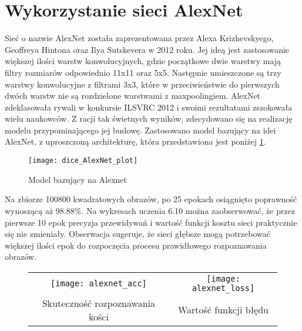 \section{Wykorzystanie sieci AlexNet}
Sieć o nazwie AlexNet \cite{AlexNetNVIDIA, AlexNetdesc, AlexNetpresentation} została
zaprezentowana przez Alexa Krizhevskyego, Geoffreya Hintona oraz Ilya Sutskevera w 2012 roku.
Jej ideą jest zastosowanie większej ilości warstw konwolucyjnych, gdzie początkowe dwie warstwy
mają filtry rozmiarów odpowiednio 11x11 oraz 5x5. Następnie umieszczone są trzy warstwy
konwolucyjne z filtrami 3x3, które w przeciwieństwie do pierwszych
dwóch warstw nie są rozdzielone warstwami z maxpoolingiem. AlexNet zdeklasowała rywali
w konkursie ILSVRC 2012 i swoimi rezultatami zszokowała wielu naukowców. Z racji tak świetnych
wyników, zdecydowano się na realizację modelu przypominającego jej budowę.
Zastosowano model bazujący na idei AlexNet, z uproszczoną architekturę, która przedstawiona jest poniżej \ref{fig:alexnet}.
\newpage
\begin{figure}[h!]
\centering
\texttt{[image: dice\_AlexNet\_plot]}
\caption{Model bazujący na Alexnet}
\label{fig:alexnet}
\end{figure}
Na zbiorze 100800 kwadratowych obrazów, po 25 epokach osiągnięto poprawność wynoszącą aż 98.88\%.
Na wykresach uczenia 6.10 można zaobserwować, że przez pierwsze 10 epok precyzja przewidywań
i wartość funkcji kosztu sieci praktycznie się nie zmieniały. Obserwacja sugeruje, że sieci
głębsze mogą potrzebować większej ilości epok do rozpoczęcia procesu prawidłowego rozpoznawania obrazów.\\
\begin{figure}[h!]
\begin{center}
\begin{tabular}{cc}
\texttt{[image: alexnet\_acc]} &
\texttt{[image: alexnet\_loss]} \\
 Skuteczność rozpoznawania kości & Wartość funkcji błędu\\
\end{tabular}
\label{fig:alexnet_plot}
\end{center}
\end{figure}\\

